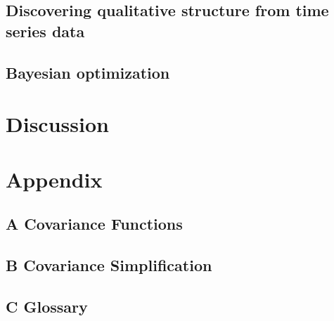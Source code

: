 \documentclass[twoside,11pt]{article}
\newcommand{\gpmem}{\texttt{gpmem}}
\begin{document}
\subsection{Discovering qualitative structure from time series data}\label{sec:structurelearning}


\subsection{Bayesian optimization}

\label{sec:thompson}




%
%
%
\section{Discussion}


\newpage
\section*{Appendix}
\subsection*{A Covariance Functions}


\subsection*{B Covariance Simplification}


\subsection*{C Glossary}

%

\newpage


\end{document}

